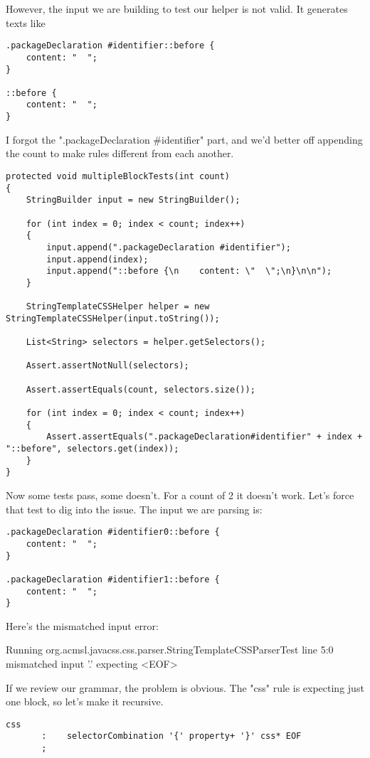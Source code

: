 \documentclass[11pt]{article}
\begin{document}
However, the input we are building to test our helper is not valid. It generates texts like

\begin{verbatim}
.packageDeclaration #identifier::before {
    content: "  ";
}

::before {
    content: "  ";
}
\end{verbatim}

I forgot the ".packageDeclaration \#identifier" part, and we'd better off appending the count to make rules different from each another.

\begin{verbatim}
protected void multipleBlockTests(int count)
{
    StringBuilder input = new StringBuilder();

    for (int index = 0; index < count; index++)
    {
        input.append(".packageDeclaration #identifier");
        input.append(index);
        input.append("::before {\n    content: \"  \";\n}\n\n");
    }

    StringTemplateCSSHelper helper = new StringTemplateCSSHelper(input.toString());

    List<String> selectors = helper.getSelectors();

    Assert.assertNotNull(selectors);

    Assert.assertEquals(count, selectors.size());

    for (int index = 0; index < count; index++)
    {
        Assert.assertEquals(".packageDeclaration#identifier" + index + "::before", selectors.get(index));
    }
}
\end{verbatim}

Now some tests pass, some doesn't. For a count of 2 it doesn't work. Let's force that test to dig into the issue. The input we are parsing is:

\begin{verbatim}
.packageDeclaration #identifier0::before {
    content: "  ";
}

.packageDeclaration #identifier1::before {
    content: "  ";
}
\end{verbatim}

Here's the mismatched input error: 

Running org.acmsl.javacss.css.parser.StringTemplateCSSParserTest
line 5:0 mismatched input '.' expecting <EOF>

If we review our grammar, the problem is obvious. The "css" rule is expecting just one block, so let's make it recursive.

\begin{verbatim}
css
       :	selectorCombination '{' property+ '}' css* EOF
       ;
\end{verbatim}
\end{document}
